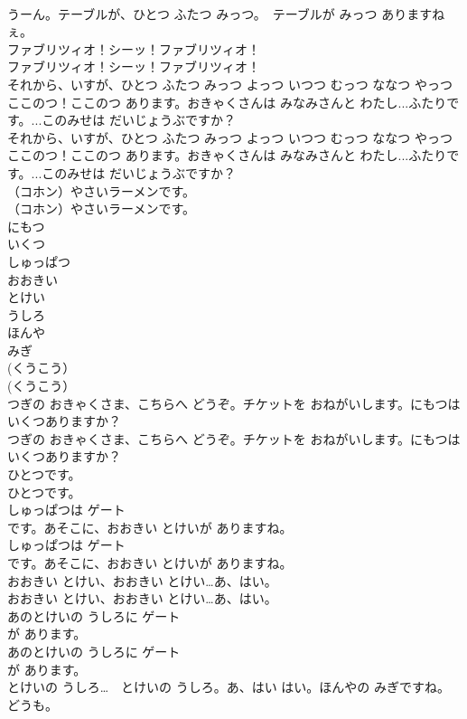 \documentclass[8pt]{extreport}
\begin{document}
\begin{CJK}{UTF8}{min}
\\	うーん。テーブルが、ひとつ ふたつ みっつ。　テーブルが みっつ ありますねぇ。 
\\	ファブリツィオ！シーッ！ファブリツィオ！	
\\	ファブリツィオ！シーッ！ファブリツィオ！ 
\\	それから、いすが、ひとつ ふたつ みっつ よっつ いつつ むっつ ななつ やっつ ここのつ！ここのつ あります。おきゃくさんは みなみさんと わたし...ふたりです。...このみせは だいじょうぶですか？	
\\	それから、いすが、ひとつ ふたつ みっつ よっつ いつつ むっつ ななつ やっつ ここのつ！ここのつ あります。おきゃくさんは みなみさんと わたし...ふたりです。...このみせは だいじょうぶですか？ 
\\	（コホン）やさいラーメンです。	
\\	（コホン）やさいラーメンです。 
\\	にもつ
\\	いくつ
\\	しゅっぱつ
\\	おおきい
\\	とけい
\\	うしろ
\\	ほんや
\\	みぎ
\\	(くうこう）	
\\	(くうこう） 
\\	つぎの おきゃくさま、こちらへ どうぞ。チケットを おねがいします。にもつは いくつありますか？	
\\	つぎの おきゃくさま、こちらへ どうぞ。チケットを おねがいします。にもつは いくつありますか？ 
\\	ひとつです。	
\\	ひとつです。 
\\	しゅっぱつは ゲート
\\	です。あそこに、おおきい とけいが ありますね。	
\\	しゅっぱつは ゲート
\\	です。あそこに、おおきい とけいが ありますね。 
\\	おおきい とけい、おおきい とけい…あ、はい。	
\\	おおきい とけい、おおきい とけい…あ、はい。 
\\	あのとけいの うしろに ゲート
\\	が あります。	
\\	あのとけいの うしろに ゲート
\\	が あります。 
\\	とけいの うしろ…　とけいの うしろ。あ、はい はい。ほんやの みぎですね。どうも。	

\end{CJK}
\end{document}
